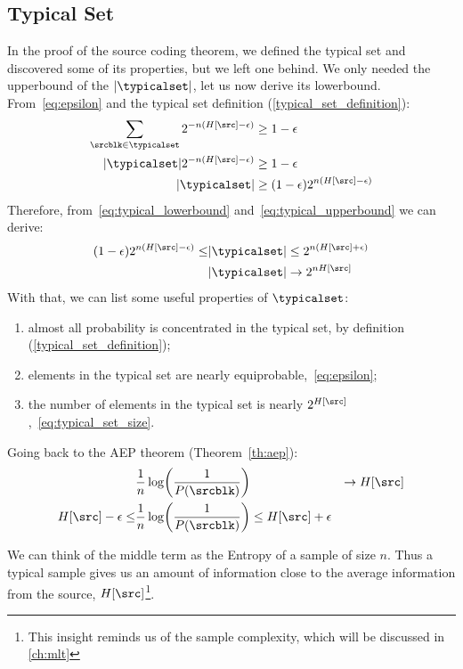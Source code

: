 \subsection{Typical Set}
In the proof of the source coding theorem, we defined the typical set and discovered some of its properties, but we left one behind. We only needed the upperbound of the \(|\typicalset|\), let us now derive its lowerbound.
From~\eqref{eq:epsilon} and the typical set definition (\eqref{typical_set_definition}):
	\begin{align}
		\sum_{\srcblk \in \typicalset}2^{-n(H[\src]-\epsilon)}&\geq 1 - \epsilon\\
		|\typicalset|2^{-n(H[\src]-\epsilon)}&\geq 1 - \epsilon\\
		|\typicalset|&\geq (1 - \epsilon)2^{n(H[\src]-\epsilon)}\label{eq:typical_lowerbound}
	\end{align}
	Therefore, from~\eqref{eq:typical_lowerbound} and~\eqref{eq:typical_upperbound} we can derive:
\begin{align}
	 (1 - \epsilon)2^{n(H[\src]-\epsilon)} \leq &|\typicalset| \leq 2 ^{n(H[\src]+\epsilon)}\\
	 &|\typicalset| \to 2 ^{nH[\src]}\label{eq:typical_set_size}
\end{align}
With that, we can list some useful properties of \(\typicalset\):
	\begin{enumerate}
		\item almost all probability is concentrated in the typical set, by definition (\eqref{typical_set_definition});
		\item elements in the typical set are nearly equiprobable,~\eqref{eq:epsilon};
		\item the number of elements in the typical set is nearly \(2^{H[\src]}\),~\eqref{eq:typical_set_size}.
	\end{enumerate}
Going back to the \ac{AEP} theorem (Theorem~\ref{th:aep}):
\begin{align}
	&\frac{1}{n}\log \biggl(\frac{1}{P(\srcblk)}\biggr) &\to H[\src] \nonumber\\
	H[\src] -\epsilon \leq 	&\frac{1}{n}\log \biggl(\frac{1}{P(\srcblk)}\biggr)\leq H[\src] +\epsilon
\end{align}

We can think of the middle term as the Entropy of a sample of size \(n\). Thus a typical sample gives us an amount of information close to the average information from the source, \(H[\src]\)\footnote{This insight reminds us of the sample complexity, which will be discussed in \cref{ch:mlt}}.

